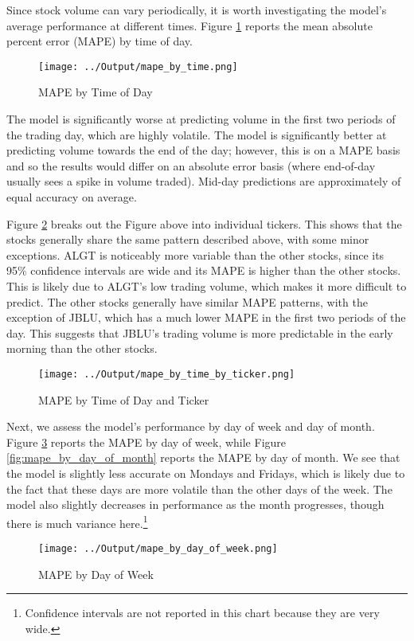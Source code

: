 \documentclass[12pt]{article}
\begin{document}
Since stock volume can vary periodically, it is worth investigating the model's average performance at different times. Figure \ref{fig:mape_by_time} reports the mean absolute percent error (MAPE) by time of day.
\begin{figure}[H]
    \centering
    \caption{MAPE by Time of Day}
    \texttt{[image: ../Output/mape\_by\_time.png]}
    \label{fig:mape_by_time}
\end{figure}
The model is significantly worse at predicting volume in the first two periods of the trading day, which are highly volatile. The model is significantly better at predicting volume towards the end of the day; however, this is on a MAPE basis and so the results would differ on an absolute error basis (where end-of-day usually sees a spike in volume traded). Mid-day predictions are approximately of equal accuracy on average.

Figure \ref{fig:mape_by_time_by_ticker} breaks out the Figure above into individual tickers. This shows that the stocks generally share the same pattern described above, with some minor exceptions. ALGT is noticeably more variable than the other stocks, since its 95\% confidence intervals are wide and its MAPE is higher than the other stocks. This is likely due to ALGT's low trading volume, which makes it more difficult to predict. The other stocks generally have similar MAPE patterns, with the exception of JBLU, which has a much lower MAPE in the first two periods of the day. This suggests that JBLU's trading volume is more predictable in the early morning than the other stocks.
\begin{figure}[H]
    \centering
    \caption{MAPE by Time of Day and Ticker}
    \texttt{[image: ../Output/mape\_by\_time\_by\_ticker.png]}
    \label{fig:mape_by_time_by_ticker}
\end{figure}

Next, we assess the model's performance by day of week and day of month. Figure \ref{fig:mape_by_day_of_week} reports the MAPE by day of week, while Figure \ref{fig:mape_by_day_of_month} reports the MAPE by day of month. We see that the model is slightly less accurate on Mondays and Fridays, which is likely due to the fact that these days are more volatile than the other days of the week. The model also slightly decreases in performance as the month progresses, though there is much variance here.\footnote{Confidence intervals are not reported in this chart because they are very wide.}
\begin{figure}[H]
    \centering
    \caption{MAPE by Day of Week}
    \texttt{[image: ../Output/mape\_by\_day\_of\_week.png]}
    \label{fig:mape_by_day_of_week}
\end{figure}
\end{document}
